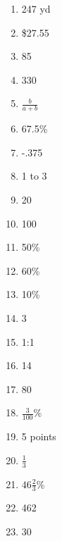 \documentclass[../uilmath.tex]{subfiles}
\begin{document}
\begin{enumerate}[label=\bfseries\arabic*.]
    \item %
    247 yd 

    \item %
    \$27.55

    \item %
    85

    \item %
    330 

    \item %
    $\frac{b}{a+b}$

    \item %
    67.5\%

    \item %
    -.375

    \item %
    1 to 3 

    \item %
    20

    \item %
    100

    \item %
    50\%

    \item %
    60\%

    \item %
    10\%

    \item %
    3

    \item %
    1:1 

    \item %
    14

    \item %
    80

    \item %
    $\frac{3}{100}$\% 

    \item %
    5 points 

    \item %
    $\frac{1}{3}$

    \item %
    $46\frac{2}{3}$\%

    \item %
    462

    \item %
    30


\end{enumerate}
\end{document}

